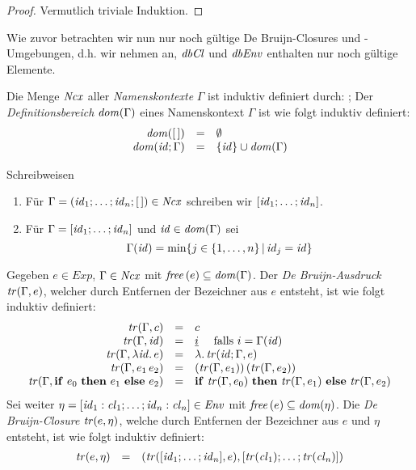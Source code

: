 \documentclass[12pt,fleqn,a4paper]{article}
\newcommand{\cl}{\name{cl}}
\begin{document}
\begin{proof}
  Vermutlich triviale Induktion.
\end{proof}

Wie zuvor betrachten wir nun nur noch g\"ultige De Bruijn-Closures und -Umgebungen, d.h. wir nehmen an,
${\text{\it dbCl\/}}$ und ${\text{\it dbEnv\/}}$ enthalten nur noch g\"ultige Elemente.

\begin{definition}[Namenskontext]
  Die Menge ${\text{\it Ncx\/}}$ aller {\em Namenskontexte} $\Gamma$ ist induktiv definiert durch:
  \bgram
  \Gamma \is [\,] \mid \id;\Gamma
  \egram
  Der {\em Definitionsbereich} ${\text{\it dom\/}}(\Gamma)$ eines Namenskontext $\Gamma$ ist wie folgt induktiv definiert:
  \[\begin{array}{rcl}
    {\text{\it dom\/}}([\,]) &=& \emptyset \\
    {\text{\it dom\/}}({\text{\it id\/}};\Gamma) &=& \{{\text{\it id\/}}\} \cup {\text{\it dom\/}}(\Gamma)
  \end{array}\]
\end{definition}

\noindent Schreibweisen
\begin{enumerate}
\item F\"ur $\Gamma=({\text{\it id\/}}_1;\ldots;{\text{\it id\/}}_n;[\,])\in{\text{\it Ncx\/}}$ schreiben wir $[{\text{\it id\/}}_1;\ldots;{\text{\it id\/}}_n]$.
\item F\"ur $\Gamma=[{\text{\it id\/}}_1;\ldots;{\text{\it id\/}}_n]$ und ${\text{\it id\/}}\in{\text{\it dom\/}}(\Gamma)$ sei
  \[ \Gamma({\text{\it id\/}}) = \min\{j \in \{1,\ldots,n\}\,|\, {\text{\it id\/}}_j = {\text{\it id\/}}\} \]
\end{enumerate}

\begin{definition}[\"Ubersetzungsfunktion]
  Gegeben $e \in Exp$, $\Gamma\in{\text{\it Ncx\/}}$ mit ${\text{\it free\/}}\,(e) \subseteq {\text{\it dom\/}}(\Gamma)$. Der {\em De Bruijn-Ausdruck}
  ${\text{\it tr\/}}(\Gamma,e)$, welcher durch Entfernen der Bezeichner aus $e$ entsteht, ist wie folgt induktiv definiert:
  \[\begin{array}{rcl}
    {\text{\it tr\/}}(\Gamma,c) &=& c \\
    {\text{\it tr\/}}(\Gamma,{\text{\it id\/}}) &=& \underline{i} \quad \text{ falls } i = \Gamma({\text{\it id\/}}) \\
    {\text{\it tr\/}}(\Gamma,\lambda {\text{\it id\/}}.\,e) &=& \lambda .\,{\text{\it tr\/}}({\text{\it id\/}};\Gamma,e) \\
    {\text{\it tr\/}}(\Gamma,e_1\,e_2) &=& ({\text{\it tr\/}}(\Gamma,e_1))\,({\text{\it tr\/}}(\Gamma,e_2)) \\
    {\text{\it tr\/}}(\Gamma,\mathbf{if}\ e_0\ \mathbf{then}\ e_1\ \mathbf{else}\ e_2) &=& \mathbf{if}\ {\text{\it tr\/}}(\Gamma,e_0)\ \mathbf{then}\ {\text{\it tr\/}}(\Gamma,e_1)\ \mathbf{else}\ {\text{\it tr\/}}(\Gamma,e_2)
  \end{array}\]
  Sei weiter $\eta=[\id_1:\cl_1;\ldots;\id_n:\cl_n]\in\Env$ mit ${\text{\it free\/}}\,(e)\subseteq {\text{\it dom\/}}(\eta)$. Die
  {\em De Bruijn-Closure} ${\text{\it tr\/}}(e,\eta)$, welche durch Entfernen der Bezeichner aus $e$ und $\eta$ entsteht,
  ist wie folgt induktiv definiert:
  \[\begin{array}{rcl}
    \tr{e,\eta} &=& (\tr{[\id_1;\ldots;\id_n],e},[\tr{\cl_1};\ldots;\tr{\cl_n}])
  \end{array}\]
\end{definition}
\end{document}
